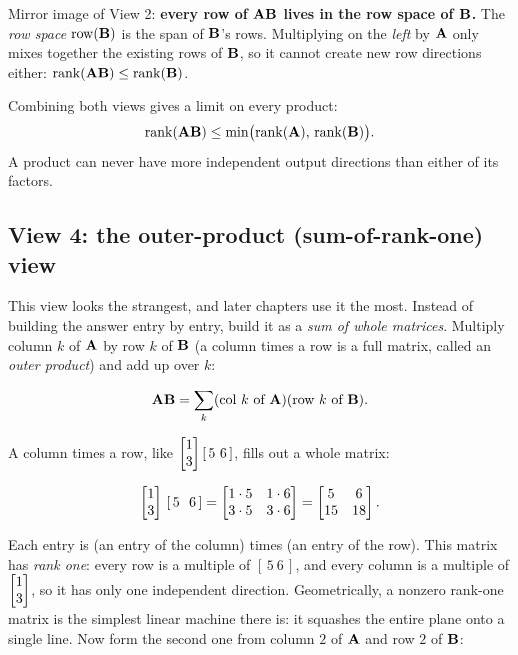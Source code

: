 \begin{focusbox}
Mirror image of View 2: \textbf{every row of $\mathbf{A}\mathbf{B}$ lives in the row space
of $\mathbf{B}$.} The \emph{row space} $\operatorname{row}(\mathbf{B})$ is the span of $\mathbf{B}$'s rows.
Multiplying on the \emph{left} by $\mathbf{A}$ only mixes together the existing rows of
$\mathbf{B}$, so it cannot create new row directions either:
$\operatorname{rank}(\mathbf{A}\mathbf{B}) \le \operatorname{rank}(\mathbf{B})$.

Combining both views gives a limit on every product:
\[
\operatorname{rank}(\mathbf{A}\mathbf{B}) \le \min\bigl(\operatorname{rank}(\mathbf{A}),\,\operatorname{rank}(\mathbf{B})\bigr).
\]
A product can never have more independent output directions than either of its factors.
\end{focusbox}

\subsection{View 4: the outer-product (sum-of-rank-one) view}

This view looks the strangest, and later chapters use it the most. Instead of building
the answer entry by entry, build it as a \emph{sum of whole matrices}. Multiply column
$k$ of $\mathbf{A}$ by row $k$ of $\mathbf{B}$ (a column times a row is a full matrix, called an
\emph{outer product}) and add up over $k$:

\[
\mathbf{A}\mathbf{B} = \sum_{k} (\text{col } k \text{ of } \mathbf{A})(\text{row } k \text{ of } \mathbf{B}).
\]

A column times a row, like $\begin{bmatrix}1\\3\end{bmatrix}[\,5 \ 6\,]$, fills out a whole matrix:

\[
\begin{bmatrix}1\\3\end{bmatrix}\,[\,5\ \ 6\,] = \begin{bmatrix} 1\cdot5 & 1\cdot6 \\ 3\cdot5 & 3\cdot6 \end{bmatrix}
= \begin{bmatrix} 5 & 6 \\ 15 & 18 \end{bmatrix}.
\]

Each entry is (an entry of the column) times (an entry of the row).
This matrix has \emph{rank one}: every row is a multiple of
$[\,5\ 6\,]$, and every column is a multiple of $\begin{bmatrix}1\\3\end{bmatrix}$, so it has only one
independent direction. Geometrically, a nonzero rank-one matrix is the simplest linear
machine there is: it squashes the entire plane onto a single line. Now form the second
one from column $2$ of $\mathbf{A}$ and row $2$ of $\mathbf{B}$:

